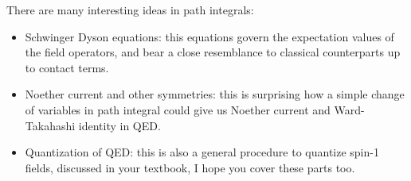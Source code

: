 \documentclass[11pt]{article}
\begin{document}
\noindent
\begin{reflection}
	There are many interesting ideas in path integrals:
	\begin{itemize}
		\item  Schwinger Dyson equations: this equations govern the expectation values of the field operators, and bear a close resemblance to classical counterparts up to contact terms.
		\item Noether current and other symmetries: this is surprising how a simple change of variables in path integral could give us Noether current and Ward-Takahashi identity in QED.
		\item Quantization of QED: this is also a general procedure to quantize spin-1 fields, discussed in your textbook, I hope you cover these parts too.
	\end{itemize}
\end{reflection}
\end{document}
